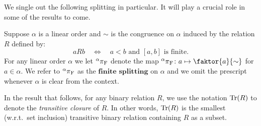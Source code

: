 We single out the following splitting in particular.  It will play a crucial
role in some of the results to come.

\begin{dfn}
	Suppose $\alpha$ is a linear order and $\sim$ is the congruence on $\alpha$
	induced by the relation $R$ defined by:
	\begin{equation} aRb\quad\iff\quad
		a<b\text{ and }[a,b]\text{ is finite}.
	\end{equation} For any linear order
	$\alpha$ we let $\fsplit[\alpha]$ denote the map $\fsplit[\alpha]\colon
	a\mapsto\faktor{a}{\sim}$ for $a\in\alpha$.  We refer to $\fsplit[\alpha]$
	as the $\textbf{finite splitting}$ on $\alpha$ and we omit the prescript
	whenever $\alpha$ is clear from the context.
\end{dfn}

In the result that follows, for any binary relation $R$, we use the notation
$\trclos(R)$ to denote the \textit{transitive closure} of $R$.  In other words,
$\trclos(R)$ is the smallest (w.r.t.\ set inclusion) transitive binary relation
containing $R$ as a subset.

